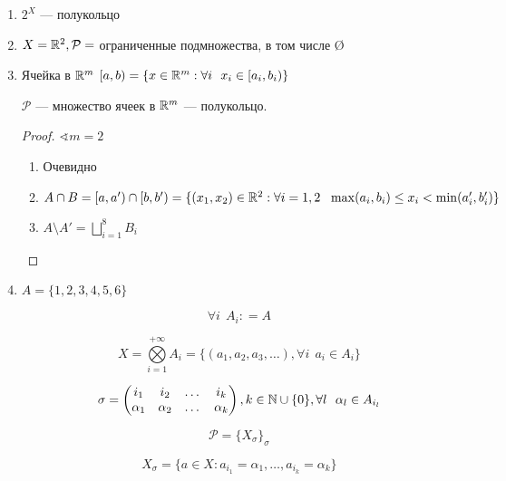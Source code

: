 \begin{example}
    \begin{enumerate}
        \item \(2^X\) --- полукольцо
        \item \(X = \mathbb{R}^2, \mathcal{P} =\) ограниченные подмножества, в том числе \O
        \item \begin{definition}
                  Ячейка в \(\mathbb{R}^m\) \([a, b) = \{x\in\mathbb{R}^m : \forall i \ \ x_i\in[a_i, b_i)\} \)
              \end{definition}

              \(\mathcal{P}\) --- множество ячеек в \(\mathbb{R}^m\) --- полукольцо.

              \begin{proof}
                  \(\sphericalangle m = 2\)
                  \begin{enumerate}
                      \item Очевидно
                      \item \(A\cap B = [a, a') \cap [b, b') = \{(x_1, x_2) \in\mathbb{R}^2 : \forall i = 1, 2 \ \ \max(a_i, b_i) \leq x_i < \min(a_i', b_i')\} \)
                      \item \(A\setminus A' = \bigsqcup\limits_{i = 1}^8 B_i \)
                  \end{enumerate}
              \end{proof}

              \begin{figure}[h]
                  \centering
                  
              \end{figure}
        \item \(A = \{1, 2, 3,4,5,6\} \)

              \[\forall i \ \ A_i : = A\]

              \[X = \bigotimes\limits_{i = 1}^{ +\infty} A_i = \{(a_1, a_2, a_3, \dots) , \forall i\ \ a_i\in A_i\} \]

              \[\sigma = \begin{pmatrix} i_1 & i_2 & \dots & i_k \\ \alpha_1 & \alpha_2 & \dots & \alpha_k \end{pmatrix}, k\in\mathbb{N}\cup \{0\} , \forall l \ \ \alpha_l\in A_{i_l} \]

              \[\mathcal{P} = \{X_\sigma\}_\sigma \]

              \[X_\sigma = \{a\in X : a_{i_1} = \alpha_1, \dots, a_{i_k} = \alpha_k\} \]


\end{enumerate}
\end{example}

